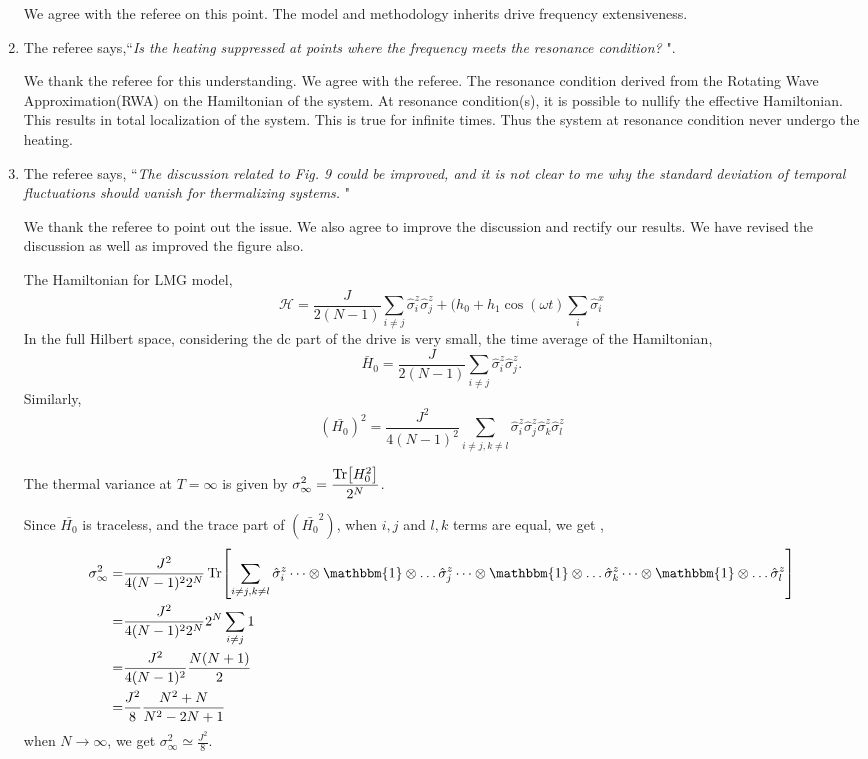 \documentclass[aps,prb,reprint,showpacs,floatfix,superscriptaddress, onecolumn, nofootinbib, 9pt]{revtex4-2}
\newcommand{\response}[1]{{\color{blue}#1}} %
\begin{document}
\begin{enumerate}
\response{    	
We agree with the referee on this point. The model and methodology inherits drive frequency extensiveness.
}
\item The referee says,``\textit{Is the heating suppressed at points where the frequency meets the resonance condition? }".

\response{
We thank the referee for this understanding. We agree with the referee. The resonance condition derived from the Rotating Wave Approximation(RWA) on the Hamiltonian of the system. At resonance condition(s), it is possible to nullify the effective Hamiltonian. This results in total localization of the system. This is true for infinite times. Thus the system at resonance condition never undergo the heating.
}

\item The referee says, ``\textit{The discussion related to Fig. 9 could be improved, and it is not clear to me why the standard deviation of temporal fluctuations should vanish for thermalizing systems. }"\\

\response{ We thank the referee to point out the issue. We also agree to improve the discussion and rectify our results. We have revised the discussion as well as improved the figure also.


The Hamiltonian for LMG model,
\begin{equation}
\mathcal{H} = \frac{J}{2(N-1)}\sum_{i\neq j}\hat{\sigma}^z_i \hat{\sigma}^z_j + (h_0 +h_1 \cos(\omega t) \sum_i \hat{\sigma}^x_i
\end{equation}
In the full Hilbert space, considering the dc part of the drive is very small, the time average of the Hamiltonian,
\begin{equation*}
	\bar{H}_0 = \frac{J}{2(N-1)}\sum_{i\neq j}\hat{\sigma}^z_i \hat{\sigma}^z_j.
\end{equation*}
Similarly,
\begin{equation}
	\left(\bar{H_0}\right)^2 = \frac{J^2}{4(N-1)^2}\sum_{i\neq j, k \neq l} \hat{\sigma}^z_i \hat{\sigma}^z_j \hat{\sigma}^z_k \hat{\sigma}^z_l
\end{equation}

The thermal variance at $T= \infty$ is given by $\displaystyle \sigma^2_{\infty} = \frac{\Tr[H^2_0]}{2^N}$. 

Since $\bar{H_0}$ is traceless, and the trace part of $\left(\bar{H_0}^2\right)$, when $i,j$ and $l,k$ terms are equal, we get ,
\begin{align*}
	\sigma_\infty^2 =& \frac{J^2}{4(N-1)^2 2^N}\Tr[\sum_{i\neq j, k \neq l} \hat{\sigma}^z_i \dots\otimes \mathbbm{1} \otimes \dots \hat{\sigma}^z_j \dots\otimes \mathbbm{1} \otimes \dots \hat{\sigma}^z_k\dots\otimes \mathbbm{1} \otimes \dots \hat{\sigma}^z_l ]\\
	=& \frac{J^2}{4(N-1)^2 2^N}   2^N \sum_{i\neq j} 1\\
	=& \frac{J^2}{4(N-1)^2} \frac{N(N+1)}{2}\\
	=& \frac{J^2}{8} \frac{N^2+N}{N^2-2N+1}
\end{align*}
when $N\rightarrow \infty$, we get $\displaystyle \sigma_\infty^2 \simeq \frac{J^2}{8}$. 

}
\end{enumerate}
\end{document}
